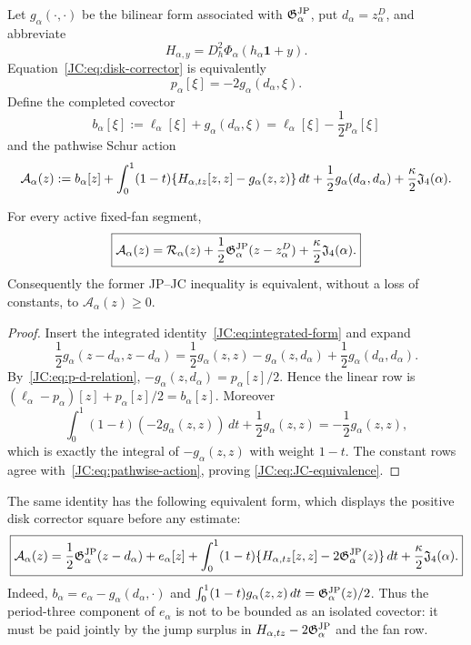 Let $g_\alpha(\cdot,\cdot)$ be the bilinear form associated with
$\mathfrak G^{\rm JP}_\alpha$, put $d_\alpha=z_\alpha^D$, and abbreviate
\begin{equation}\label{JC:eq:Hessian-family}
 H_{\alpha,y}=D_h^2\Phi_\alpha(h_\alpha\mathbf1+y).
\end{equation}
Equation~\eqref{JC:eq:disk-corrector} is equivalently
\begin{equation}\label{JC:eq:p-d-relation}
 p_\alpha[\xi]=-2g_\alpha(d_\alpha,\xi).
\end{equation}
Define the completed covector
\begin{equation}\label{JC:eq:completed-covector}
 b_\alpha[\xi]
 :=\ell_\alpha[\xi]+g_\alpha(d_\alpha,\xi)
 =\ell_\alpha[\xi]-\frac12p_\alpha[\xi]
\end{equation}
and the pathwise Schur action
\begin{equation}\label{JC:eq:pathwise-action}
 \mathcal{A}_\alpha(z):=
 b_\alpha[z]
 +\int_0^1(1-t)
 \{H_{\alpha,tz}[z,z]-g_\alpha(z,z)\}\,dt
 +\frac12g_\alpha(d_\alpha,d_\alpha)
 +\frac\kappa2\mathfrak J_4(\alpha).
\end{equation}

\begin{proposition}
\label{JC:prop:JC-ALG}
For every active fixed-fan segment,
\begin{equation}\label{JC:eq:JC-equivalence}
 \boxed{
 \mathcal{A}_\alpha(z)
 =\mathcal{R}_\alpha(z)
  +\frac12\mathfrak G^{\rm JP}_\alpha(z-z_\alpha^D)
  +\frac\kappa2\mathfrak J_4(\alpha).}
\end{equation}
Consequently the former JP--JC inequality is equivalent, without a loss
of constants, to $\mathscr A_\alpha(z)\ge0$.
\end{proposition}

\begin{proof}
Insert the integrated identity~\eqref{JC:eq:integrated-form} and expand
\[
 \frac12g_\alpha(z-d_\alpha,z-d_\alpha)
 =\frac12g_\alpha(z,z)-g_\alpha(z,d_\alpha)
   +\frac12g_\alpha(d_\alpha,d_\alpha).
\]
By~\eqref{JC:eq:p-d-relation},
$-g_\alpha(z,d_\alpha)=p_\alpha[z]/2$.  Hence the linear row is
$(\ell_\alpha-p_\alpha)[z]+p_\alpha[z]/2=b_\alpha[z]$.
Moreover
\[
 \int_0^1(1-t)(-2g_\alpha(z,z))\,dt
 +\frac12g_\alpha(z,z)=-\frac12g_\alpha(z,z),
\]
which is exactly the integral of $-g_\alpha(z,z)$ with weight $1-t$.
The constant rows agree with~\eqref{JC:eq:pathwise-action}, proving
\eqref{JC:eq:JC-equivalence}.
\end{proof}

The same identity has the following equivalent form, which displays the
positive disk corrector square before any estimate:
\begin{equation}\label{JC:eq:joint-Peano-block}
 \boxed{
 \mathcal{A}_\alpha(z)
 =\frac12\mathfrak G^{\rm JP}_\alpha(z-d_\alpha)
  +e_\alpha[z]
  +\int_0^1(1-t)
    \{H_{\alpha,tz}[z,z]-2\mathfrak G^{\rm JP}_\alpha(z)\}\,dt
  +\frac\kappa2\mathfrak J_4(\alpha).}
\end{equation}
Indeed, $b_\alpha=e_\alpha-g_\alpha(d_\alpha,\cdot)$ and
$\int_0^1(1-t)g_\alpha(z,z)\,dt=\mathfrak G^{\rm JP}_\alpha(z)/2$.
Thus the period-three component of $e_\alpha$ is not to be bounded as an
isolated covector: it must be paid jointly by the jump surplus in
$H_{\alpha,tz}-2\mathfrak G^{\rm JP}_\alpha$ and the fan row.

